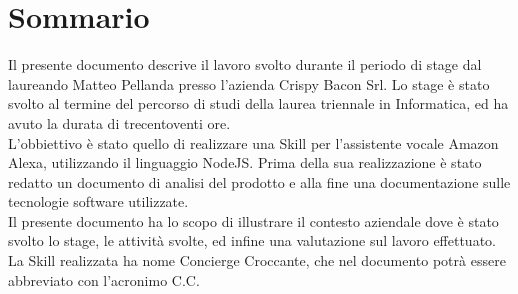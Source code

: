 
\cleardoublepage
{}
{}
\begingroup
\let\clearpage\relax
\let\cleardoublepage\relax
\let\cleardoublepage\relax

\chapter*{Sommario}

Il presente documento descrive il lavoro svolto durante il periodo di stage dal laureando Matteo Pellanda presso l'azienda Crispy Bacon Srl. Lo stage è stato svolto al termine del percorso di studi della laurea triennale in Informatica, ed ha avuto la durata di trecentoventi ore.\\[0.4cm]
L'obbiettivo è stato quello di realizzare una Skill per l'assistente vocale Amazon Alexa, utilizzando il linguaggio NodeJS. Prima della sua realizzazione è stato redatto un documento di analisi del prodotto e alla fine una documentazione sulle tecnologie software utilizzate.\\[0.4cm]
Il presente documento ha lo scopo di illustrare il contesto aziendale dove è stato svolto lo stage, le attività svolte, ed infine una valutazione sul lavoro effettuato.
La Skill realizzata ha nome Concierge Croccante, che nel documento potrà essere abbreviato con l'acronimo C.C.  

%
%

\endgroup			

\vfill

